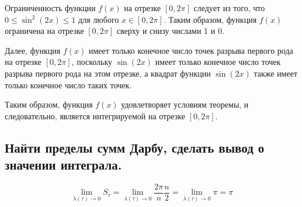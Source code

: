 \documentclass{article}
\begin{document}
Ограниченность функции $f(x)$ на отрезке $[0,2\pi]$ следует из того, что $0 \leq \sin^2(2x) \leq 1$ для любого $x \in [0,2\pi]$. Таким образом, функция $f(x)$ ограничена на отрезке $[0,2\pi]$ сверху и снизу числами 1 и 0.

Далее, функция $f(x)$ имеет только конечное число точек разрыва первого рода на отрезке $[0,2\pi]$, поскольку $\sin(2x)$ имеет только конечное число точек разрыва первого рода на этом отрезке, а квадрат функции $\sin(2x)$ также имеет только конечное число таких точек.

Таким образом, функция $f(x)$ удовлетворяет условиям теоремы, и следовательно, является интегрируемой на отрезке $[0,2\pi]$.
\begin{center}
\subsection*{Найти пределы сумм Дарбу, сделать вывод о значении интеграла.}
\end{center}
$$\lim\limits_{\lambda (\tau) \to 0} S_\tau =\lim\limits_{\lambda (\tau) \to 0} \frac{2\pi}{n}\frac{n}{2}  =\lim\limits_{\lambda (\tau) \to 0} \pi = \pi$$
\end{document}
